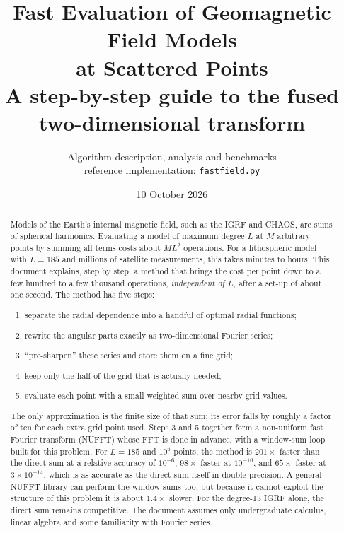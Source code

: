 \documentclass[11pt,a4paper]{article}
\title{Fast Evaluation of Geomagnetic Field Models\\at Scattered Points\\[6pt]
\large A step-by-step guide to the fused two-dimensional transform}
\author{Algorithm description, analysis and benchmarks\\[2pt]\small reference implementation: \texttt{fastfield.py}}
\date{10 October 2026}
\theoremstyle{definition}
\begin{document}
\maketitle

\begin{abstract}
Models of the Earth's internal magnetic field, such as the IGRF and CHAOS, are sums of spherical harmonics. Evaluating
a model of maximum degree $L$ at $M$ arbitrary points by summing all terms costs about $ML^2$ operations. For a
lithospheric model with $L=185$ and millions of satellite measurements, this takes minutes to hours. This document explains, step by step,
a method that brings the cost per point down to a few hundred to a few thousand operations, \emph{independent of $L$},
after a set-up of about one second. The method has five steps:
\begin{enumerate}[label=(\arabic*),leftmargin=2.2em]
\item separate the radial dependence into a handful of optimal radial functions;
\item rewrite the angular parts exactly as two-dimensional Fourier series;
\item ``pre-sharpen'' these series and store them on a fine grid;
\item keep only the half of the grid that is actually needed;
\item evaluate each point with a small weighted sum over nearby grid values.
\end{enumerate}
The only approximation is the finite size of that sum; its error falls by roughly a factor of ten for each extra grid point used.
Steps 3 and 5 together form a non-uniform fast Fourier transform (NUFFT) whose FFT is done in advance, with a window-sum loop built for this
problem. For $L=185$ and $10^6$ points, the method is $201\times$ faster than the direct sum at a relative accuracy of $10^{-6}$, $98\times$ faster
at $10^{-10}$, and $65\times$ faster at $3\times10^{-14}$, which is as accurate as the direct sum itself in double precision. A general NUFFT
library can perform the window sums too, but because it cannot exploit the structure of this problem it is about $1.4\times$ slower.
For the degree-13 IGRF alone, the direct sum remains competitive. The document assumes only undergraduate calculus,
linear algebra and some familiarity with Fourier series.
\end{abstract}

\tableofcontents

\end{document}
